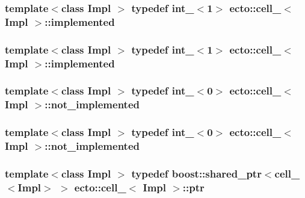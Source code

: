 \hypertarget{structecto_1_1cell___a63c5c3dd95630a508017730ee345c23a}{
\subsubsection[{implemented}]{\setlength{\rightskip}{0pt plus 5cm}template$<$class Impl $>$ typedef {\bf int\-\_\-}$<$1$>$ {\bf ecto\-::cell\-\_\-}$<$ Impl $>$\-::{\bf implemented}}}\label{structecto_1_1cell___a63c5c3dd95630a508017730ee345c23a}
\hypertarget{structecto_1_1cell___a63c5c3dd95630a508017730ee345c23a}{
\subsubsection[{implemented}]{\setlength{\rightskip}{0pt plus 5cm}template$<$class Impl $>$ typedef {\bf int\-\_\-}$<$1$>$ {\bf ecto\-::cell\-\_\-}$<$ Impl $>$\-::{\bf implemented}}}\label{structecto_1_1cell___a63c5c3dd95630a508017730ee345c23a}
\hypertarget{structecto_1_1cell___a3e48e52421d132bb2bb4e343f771abeb}{
\subsubsection[{not\-\_\-implemented}]{\setlength{\rightskip}{0pt plus 5cm}template$<$class Impl $>$ typedef {\bf int\-\_\-}$<$0$>$ {\bf ecto\-::cell\-\_\-}$<$ Impl $>$\-::{\bf not\-\_\-implemented}}}\label{structecto_1_1cell___a3e48e52421d132bb2bb4e343f771abeb}
\hypertarget{structecto_1_1cell___a3e48e52421d132bb2bb4e343f771abeb}{
\subsubsection[{not\-\_\-implemented}]{\setlength{\rightskip}{0pt plus 5cm}template$<$class Impl $>$ typedef {\bf int\-\_\-}$<$0$>$ {\bf ecto\-::cell\-\_\-}$<$ Impl $>$\-::{\bf not\-\_\-implemented}}}\label{structecto_1_1cell___a3e48e52421d132bb2bb4e343f771abeb}
\hypertarget{structecto_1_1cell___a26d9e255a2ba0335c5e90fd04efa6bfa}{
\subsubsection[{ptr}]{\setlength{\rightskip}{0pt plus 5cm}template$<$class Impl $>$ typedef boost\-::shared\-\_\-ptr$<${\bf cell\-\_\-}$<$Impl$>$ $>$ {\bf ecto\-::cell\-\_\-}$<$ Impl $>$\-::{\bf ptr}}}\label{structecto_1_1cell___a26d9e255a2ba0335c5e90fd04efa6bfa}
